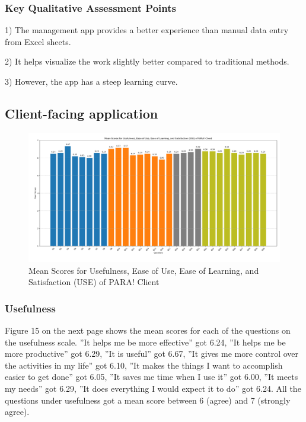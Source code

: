 \documentclass[journal]{./IEEE/IEEEtran}
\begin{document}
\subsubsection{Key Qualitative Assessment Points}
\begin{description}
    \item 1) The management app provides a better experience than manual data entry from Excel sheets.
    \item 2) It helps visualize the work slightly better compared to traditional methods.
    \item 3) However, the app has a steep learning curve.
\end{description}

\subsection{Client-facing application}
\begin{figure}[h]
    \centering
        \includegraphics[scale=0.18]{./figures/client means.png}
    \caption{Mean Scores for Usefulness, Ease of Use, Ease of Learning, and Satisfaction (USE) of PARA! Client}
\end{figure}

\subsubsection{Usefulness}
Figure 15 on the next page shows the mean scores for each of the questions on the usefulness scale.
”It helps me be more effective” got 6.24, ”It helps me be more productive” got 6.29, ”It is useful” got 6.67, ”It gives me more control over the activities in my life” got 6.10, ”It makes the things I want to accomplish easier to get done” got 6.05, ”It saves me time when I use it” got 6.00, ”It meets my needs” got 6.29, ”It does everything I would expect it to do” got 6.24.
All the questions under usefulness got a mean score between 6 (agree) and 7 (strongly agree).
\end{document}
